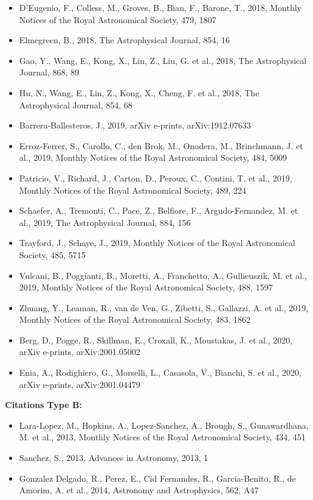 \documentclass{letter}
\begin{document}
\begin{enumerate}
\begin{itemize}
\item D'Eugenio, F., Colless, M., Groves, B., Bian, F., Barone, T., 2018, Monthly Notices of the Royal Astronomical Society, 479, 1807
\item Elmegreen, B., 2018, The Astrophysical Journal, 854, 16
\item Gao, Y., Wang, E., Kong, X., Lin, Z., Liu, G. et al., 2018, The Astrophysical Journal, 868, 89
\item Hu, N., Wang, E., Lin, Z., Kong, X., Cheng, F. et al., 2018, The Astrophysical Journal, 854, 68
\item Barrera-Ballesteros, J., 2019, arXiv e-prints, arXiv:1912.07633
\item Erroz-Ferrer, S., Carollo, C., den Brok, M., Onodera, M., Brinchmann, J. et al., 2019, Monthly Notices of the Royal Astronomical Society, 484, 5009
\item Patricio, V., Richard, J., Carton, D., Peroux, C., Contini, T. et al., 2019, Monthly Notices of the Royal Astronomical Society, 489, 224
\item Schaefer, A., Tremonti, C., Pace, Z., Belfiore, F., Argudo-Fernandez, M. et al., 2019, The Astrophysical Journal, 884, 156
\item Trayford, J., Schaye, J., 2019, Monthly Notices of the Royal Astronomical Society, 485, 5715
\item Vulcani, B., Poggianti, B., Moretti, A., Franchetto, A., Gullieuszik, M. et al., 2019, Monthly Notices of the Royal Astronomical Society, 488, 1597
\item Zhuang, Y., Leaman, R., van de Ven, G., Zibetti, S., Gallazzi, A. et al., 2019, Monthly Notices of the Royal Astronomical Society, 483, 1862
\item Berg, D., Pogge, R., Skillman, E., Croxall, K., Moustakas, J. et al., 2020, arXiv e-prints, arXiv:2001.05002
\item Enia, A., Rodighiero, G., Morselli, L., Casasola, V., Bianchi, S. et al., 2020, arXiv e-prints, arXiv:2001.04479
\end{itemize}
{\bf Citations Type B:}
\begin{itemize}
\item Lara-Lopez, M., Hopkins, A., Lopez-Sanchez, A., Brough, S., Gunawardhana, M. et al., 2013, Monthly Notices of the Royal Astronomical Society, 434, 451
\item Sanchez, S., 2013, Advances in Astronomy, 2013, 1
\item Gonzalez Delgado, R., Perez, E., Cid Fernandes, R., Garcia-Benito, R., de Amorim, A. et al., 2014, Astronomy and Astrophysics, 562, A47

\end{itemize}
\end{enumerate}
\end{document}
